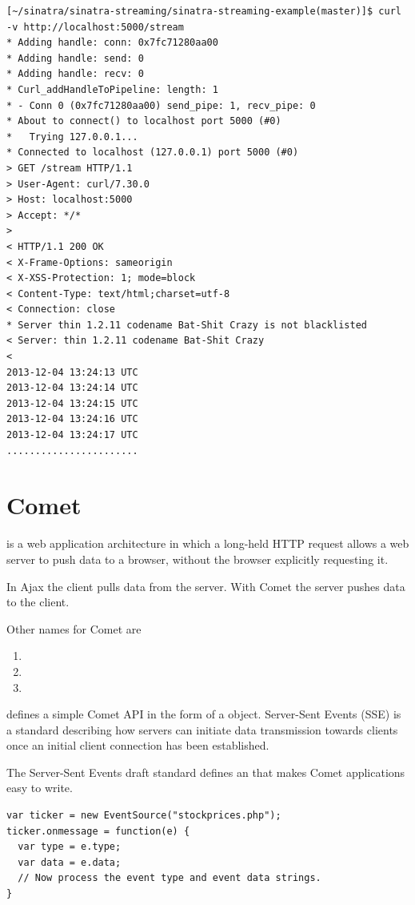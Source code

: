 \begin{verbatim}
[~/sinatra/sinatra-streaming/sinatra-streaming-example(master)]$ curl -v http://localhost:5000/stream
* Adding handle: conn: 0x7fc71280aa00
* Adding handle: send: 0
* Adding handle: recv: 0
* Curl_addHandleToPipeline: length: 1
* - Conn 0 (0x7fc71280aa00) send_pipe: 1, recv_pipe: 0
* About to connect() to localhost port 5000 (#0)
*   Trying 127.0.0.1...
* Connected to localhost (127.0.0.1) port 5000 (#0)
> GET /stream HTTP/1.1
> User-Agent: curl/7.30.0
> Host: localhost:5000
> Accept: */*
> 
< HTTP/1.1 200 OK
< X-Frame-Options: sameorigin
< X-XSS-Protection: 1; mode=block
< Content-Type: text/html;charset=utf-8
< Connection: close
* Server thin 1.2.11 codename Bat-Shit Crazy is not blacklisted
< Server: thin 1.2.11 codename Bat-Shit Crazy
< 
2013-12-04 13:24:13 UTC
2013-12-04 13:24:14 UTC
2013-12-04 13:24:15 UTC
2013-12-04 13:24:16 UTC
2013-12-04 13:24:17 UTC
.......................
\end{verbatim}

\section{Comet}

 is a web application architecture in which a long-held HTTP
request allows a web server to push data to a browser, without the
browser explicitly requesting it.

In Ajax the client pulls data from the server. With Comet the server pushes data to the client.

Other names for Comet are
\begin{enumerate}
\item 
{}
\item 
{}
\item 
{}
\end{enumerate}

 defines a simple Comet API in the form of a \EventSource{}
object.
Server-Sent Events (SSE) is a standard describing how servers can initiate data transmission towards clients once an initial client connection has been established. 

The Server-Sent Events draft standard defines an \EventSource{} that makes Comet applications
easy to write.

\begin{verbatim}
var ticker = new EventSource("stockprices.php"); 
ticker.onmessage = function(e) {
  var type = e.type; 
  var data = e.data;
  // Now process the event type and event data strings. 
}
\end{verbatim}

